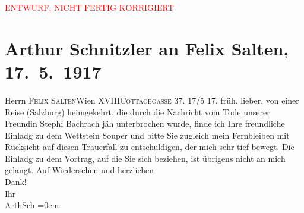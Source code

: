 
\begin{center}
            \textcolor{red}{ENTWURF, NICHT FERTIG KORRIGIERT}
                      \end{center}
            
         
         \renewcommand{\erwaehntePersonen}{Personen: Stefanie Bachrach, Felix Salten, Oscar Wettstein}
         \renewcommand{\erwaehnteOrte}{Orte: Cottagegasse, Salzburg, Wien, XVIII., Währing}
         \renewcommand{\erwaehnteWerke}{}
               \section[Arthur Schnitzler an Felix Salten, 17. 5. 1917]{ Arthur Schnitzler an Felix Salten, 17. 5. 1917}\nopagebreak{}\rehead{ }\begin{ledgroupsized}[t]{13cm}\normalsize\beginnumbering \toendnotes[C]{\smallbreak\pagebreak[2]} 
\pstart{}{\pb}Herrn \textsc{Felix
                     Salten}\pend{}\pstart{}Wien XVIII\pend{}\pstart{}\textsc{Cottagegasse 37}.\pend{}{\bigskip}\pstart
           \raggedleft{}{\pb}17/5 17.\pend
           \pstart
           \raggedleft{}früh. \pend
           \pstart
           lieber, von einer Reise (Salzburg) heimgekehrt, die durch die Nachricht vom Tode unserer Freundin Stephi Bachrach jäh unterbrochen wurde, finde
               ich Ihre freundliche Einladg zu dem Wettstein
               Souper und bitte Sie zugleich mein Fernbleiben mit Rücksicht auf diesen Trauerfall zu
               entschuldigen, der mich sehr tief bewegt. \pend
           \pstart
           Die Einladg zu dem Vortrag, auf die Sie sich beziehen, ist übrigens nicht an mich
               gelangt. \pend
           \pstart
           Auf Wiedersehen und herzlichen {\\[\baselineskip]}Dank! {\\[\baselineskip]}Ihr {\\[\baselineskip]}\spacefill\mbox{ArthSch}\pend
           \leftskip=0em{}
         
         \endnumbering{}\end{ledgroupsized}\begin{anhang}\end{anhang}\newcommand{\dateiname}{L03019}\newcommand{\titel}{Arthur Schnitzler an Felix Salten, 17. 5. 1917}\newcommand{\editorInnen}{Martin Anton Müller und Laura Untner}
      
